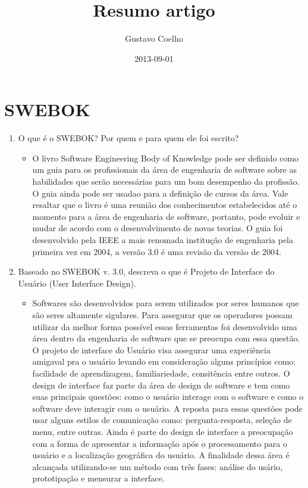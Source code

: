 \documentclass{article}
\title{Resumo artigo}
\date{2013-09-01}
\author{Gustavo Coelho}
\begin{document}

\tableofcontents{}

\newpage
\section{SWEBOK}

\begin{enumerate}
\item O que é o SWEBOK? Por quem e para quem ele foi escrito?  
	\begin{itemize}
	\item[] O livro Software Engineering Body of Knowledge pode ser definido como um guia para os profissionais da área de engenharia de software sobre as habilidades que serão necessárias para um bom desempenho da profissão. 
 O guia ainda pode ser usadao para a definição de cursos da área. Vale resaltar que o livro é uma reunião dos conhecimentos estabelecidos até o momento para a área de engenharia de software, portanto, pode evoluir e mudar de acordo com o desenvolvimento de novas teorias. O guia foi desenvolvido pela IEEE a mais renomada institução de engenharia pela primeira vez em 2004, a versão 3.0 é uma revisão da versão de 2004.  
	\end{itemize}
\item Baseado   no   SWEBOK   v.   3.0,   descreva   o   que   é   Projeto   de   Interface   do   Usuário   (User  
Interface Design). 
	\begin{itemize}
	\item[] Softwares são desenvolvidos para serem utilizados por seres humanos que são seres altamente sigulares.
 Para assegurar que os operadores possam utilizar da melhor forma possível essas ferramentas foi desenvolvido 
uma área dentro da engenharia de software que se preocupa com essa questão. 
O projeto de interface do Usuário visa assegurar uma experiência amigaval pra 
o usuário levando em consideração alguns princípios como: facilidade de aprendizagem, familiariedade, consitência entre outros.
O design de interface faz parte da área de design de software e tem como  suas principais questões: como o usuário
interage com o software e como o software deve interagir com o usuário. A reposta para essas questões pode usar alguns estilos de comunicação como: pergunta-resposta, seleção de menu, entre outras. Ainda é parte do design de interface
a preocupação com a forma de apresentar a informação após o processamento para o usuário e a localização geográfica do usuário. 
A finalidade dessa área é alcançada utilizando-se
um método com três fases: análise do usário, prototipação e mensurar a interface. 

\end{itemize}
\end{enumerate}
\end{document}
